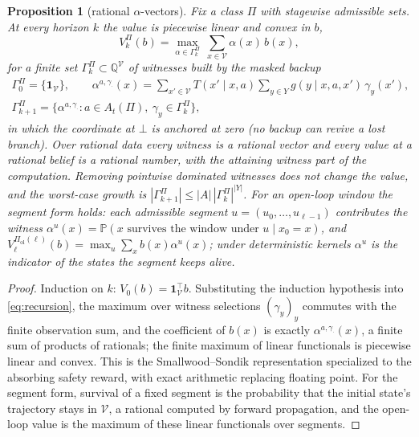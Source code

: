 \documentclass[11pt,a4paper]{article}
\theoremstyle{plain}
\newtheorem{proposition}[theorem]{Proposition}
\theoremstyle{definition}
\theoremstyle{remark}
\newcommand{\Qr}{\mathbb{Q}}
\newcommand{\Prob}{\mathbb{P}}
\newcommand{\calV}{\mathcal{V}}
\newcommand{\ol}{\mathrm{ol}}
\begin{document}
\begin{proposition}[rational $\alpha$-vectors]\label{prop:alpha}
Fix a class $\Pi$ with stagewise admissible sets. At every horizon $k$ the value is piecewise linear and convex in $b$,
\[
V^{\Pi}_k(b)=\max_{\alpha\in\Gamma^{\Pi}_k}\ \sum_{x\in\calV}\alpha(x)\,b(x),
\]
for a finite set $\Gamma^{\Pi}_k\subset\Qr^{\calV}$ of \emph{witnesses} built by the masked backup
\begin{equation}\label{eq:backup}
\begin{gathered}
\Gamma^{\Pi}_0=\{\mathbf 1_{\calV}\},\qquad
\alpha^{a,\gamma_{\cdot}}(x)=\sum_{x'\in\calV}T(x'\mid x,a)\sum_{y\in Y}g(y\mid x,a,x')\,\gamma_y(x'),\\
\Gamma^{\Pi}_{k+1}=\{\alpha^{a,\gamma_{\cdot}}:a\in A_t(\Pi),\ \gamma_y\in\Gamma^{\Pi}_k\},
\end{gathered}
\end{equation}
in which the coordinate at $\bot$ is anchored at zero (no backup can revive a lost branch). Over rational data every witness is a rational vector and every value at a rational belief is a rational number, with the attaining witness part of the computation. Removing pointwise dominated witnesses does not change the value, and the worst-case growth is $|\Gamma^{\Pi}_{k+1}|\le|A|\,|\Gamma^{\Pi}_k|^{|Y|}$. For an open-loop window the \emph{segment form} holds: each admissible segment $u=(u_0,\dots,u_{\ell-1})$ contributes the witness $\alpha^{u}(x)=\Prob(x\text{ survives the window under }u\mid x_0=x)$, and $V^{\Pi_{\ol}(\ell)}_{\ell}(b)=\max_u\sum_x b(x)\alpha^u(x)$; under deterministic kernels $\alpha^u$ is the indicator of the states the segment keeps alive.
\end{proposition}

\begin{proof}
Induction on $k$: $V_0(b)=\mathbf 1_{\calV}^{\!\top}b$. Substituting the induction hypothesis into \eqref{eq:recursion}, the maximum over witness selections $(\gamma_y)_y$ commutes with the finite observation sum, and the coefficient of $b(x)$ is exactly $\alpha^{a,\gamma_\cdot}(x)$, a finite sum of products of rationals; the finite maximum of linear functionals is piecewise linear and convex. This is the Smallwood--Sondik representation \cite{SmallwoodSondik1973} specialized to the absorbing safety reward, with exact arithmetic replacing floating point. For the segment form, survival of a fixed segment is the probability that the initial state's trajectory stays in $\calV$, a rational computed by forward propagation, and the open-loop value is the maximum of these linear functionals over segments.
\end{proof}
\end{document}

